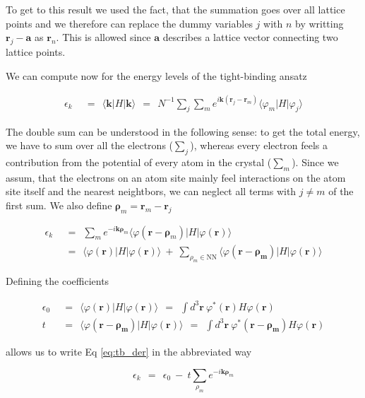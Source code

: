 \documentclass[10pt]{report}
\numberwithin{equation}{chapter}
\newcommand{\refEq}[1]{
  Eq  \ref{#1}
}
\begin{document}
To get to this result we used the fact, that the summation goes over all lattice points and we therefore can replace the dummy variables $j$ with $n$ by writting $\mathbf{r}_j - \mathbf{a}$ as $\mathbf{r}_n$. This is allowed since $\mathbf{a}$ describes a lattice vector connecting two lattice points.

We can compute now for the energy levels of the tight-binding ansatz

\begin{align}
  \epsilon_k ~~& =~~ \langle \mathbf{k} | H | \mathbf{k} \rangle ~~=~~
  N^{-1} \sum_j \sum_m e^{i\mathbf{k} (\mathbf{r}_j - \mathbf{r}_m)} 
  \langle \varphi_m | H | \varphi_j \rangle 
\end{align}

The double sum can be understood in the following sense: to get the total energy, we have to sum over all the electrons ($\sum_j$), whereas every electron feels a contribution from the potential of every atom in the crystal ($\sum_m$). Since we assum, that the electrons on an atom site mainly feel interactions on the atom site itself and the nearest neightbors, we can neglect all terms with $j \neq m$ of the first sum. We also define $\mathbf{\rho}_m = \mathbf{r}_m - \mathbf{r}_j$

\begin{align} \label{eq:tb_der}
  \epsilon_k ~~& =~~ \sum_m e^{-i\mathbf{k} \mathbf{\rho}_m} \langle \varphi(\mathbf{r}-\mathbf{\rho}_m) | H | \varphi(\mathbf{r}) \rangle \nonumber \\
  ~~& =~~ \langle \varphi(\mathbf{r}) |H| \varphi(\mathbf{r}) \rangle 
  ~+~ \sum_{\rho_m \in \text{NN}} \langle \varphi(\mathbf{r} - \mathbf{\rho_m}) |H| \varphi(\mathbf{r}) \rangle
\end{align}

Defining the coefficients 

\begin{align}
  \epsilon_0 ~~& =~~ \langle \varphi(\mathbf{r}) | H | \varphi(\mathbf{r}) \rangle  ~~=~~
  \int d^3\mathbf{r}\ \varphi^*(\mathbf{r}) H \varphi(\mathbf{r}) \\
  t ~~& =~~ \langle \varphi(\mathbf{r} - \mathbf{\rho_m}) |H| \varphi(\mathbf{r}) \rangle 
  ~~=~~ \int d^3\mathbf{r}\ \varphi^*(\mathbf{r} - \mathbf{\rho_m}) H \varphi(\mathbf{r})
\end{align}

allows us to write \refEq{eq:tb_der} in the abbreviated way

\begin{equation} \label{eq:tb}
  \epsilon_k ~~=~~ \epsilon_0 ~-~ t \sum_{\rho_m} e^{-i\mathbf{k} \mathbf{\rho}_m}
\end{equation}
\end{document}
